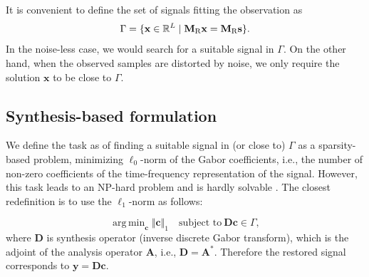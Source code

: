 \documentclass[conference]{IEEEtran}
\newcommand{\todo}[1]{\textcolor{red}{#1}}
\begin{document}
It is convenient to define the set of signals fitting the observation as
\begin{equation}
	\label{eq:Gamma}
	\Gamma = \lbrace \mathbf{x}\in \mathbb {R}^L\mid \mathbf{M}_{\textup{R}}\mathbf{x}=\mathbf{M}_{\textup{R}}\mathbf {s}\rbrace.
\end{equation}
In the noise-less case, we would search for a suitable signal in $\Gamma$.
On the other hand, when the observed samples are distorted by noise, we only require the solution $\mathbf{x}$ to be close to $\Gamma$.

\subsection{Synthesis-based formulation}\label{subsec:freqcoef}

We define the task as of finding a suitable signal in (or close to) $\Gamma$ as a sparsity-based problem, minimizing $ \ell_0 $-norm of the Gabor coefficients, i.e., the number of non-zero coefficients of the time-frequency representation of the signal.
However, this task leads to an NP-hard problem and is hardly solvable \cite{Mokry2020}.
The closest redefinition is to use the $ \ell_1 $-norm as follows:

\begin{equation}
	\label{eq:synthesis.gamma}
	\mathop {\operatorname{arg \, min}}_\mathbf {c}\Vert \mathbf {c}\Vert _1 \quad \text{subject to}\ \mathbf{D}\mathbf {c}\in \Gamma,
\end{equation} 
where $\mathbf{D} $ is synthesis operator (inverse discrete Gabor transform), which is the adjoint of the analysis operator $ \mathbf{A} $, i.e., $ \mathbf{D} = \mathbf{A}^* $.
Therefore the restored signal corresponds to $ \mathbf {y} =  \mathbf{D}\mathbf {c}$.

\end{document}
